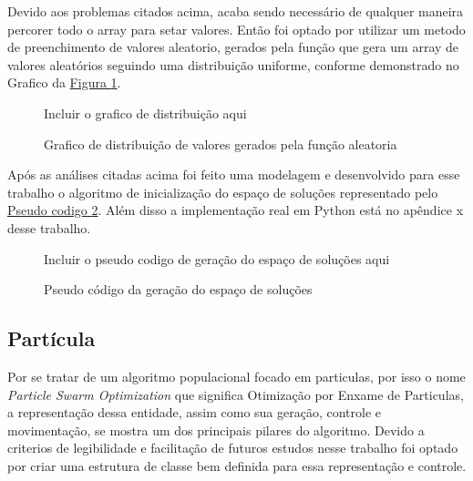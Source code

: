                 \noindent Devido aos problemas citados acima, acaba sendo necessário de qualquer maneira percorer todo o array para setar valores. \newline 
                Então foi optado por utilizar um metodo de preenchimento de valores aleatorio, 
                gerados pela função  que gera um array de valores aleatórios seguindo uma distribuição uniforme, 
                conforme demonstrado no Grafico da \hyperref[fig:distrib-uniforme]{Figura \ref{fig:distrib-uniforme}}.

                \begin{figure}[h]
                    \centering
                    \small{Incluir o grafico de distribuição aqui}
                    \caption{Grafico de distribuição de valores gerados pela função aleatoria}
                    \label{fig:distrib-uniforme}
                \end{figure}
                

            Após as análises citadas acima foi feito uma modelagem e desenvolvido para esse trabalho o algoritmo de inicialização do espaço de soluções representado pelo 
            \hyperref[fig:pseudocodigo-solutionspace]{Pseudo codigo \ref{fig:pseudocodigo-solutionspace}}. 
            Além disso a implementação real em Python está no apêndice x desse trabalho.\hfill

            \begin{figure}[h]
                \centering
                \small{Incluir o pseudo codigo de geração do espaço de soluções aqui}
                \caption{Pseudo código da geração do espaço de soluções}
                \label{fig:pseudocodigo-solutionspace}
            \end{figure}
        


    \subsection{Partícula}
            Por se tratar de um algoritmo populacional focado em particulas, por isso o nome \textit{Particle Swarm Optimization} que significa Otimização por Enxame de Particulas, a representação dessa entidade, assim como sua geração, controle e movimentação, se mostra um dos principais pilares do algoritmo. Devido a criterios de legibilidade e facilitação de futuros estudos nesse trabalho foi optado por criar uma estrutura de classe bem definida para essa representação e controle.
        

